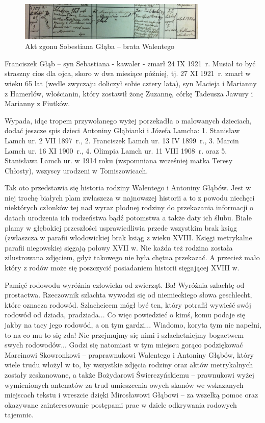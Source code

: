 \begin{figure}[!h]
\begin{center}
\includegraphics[width=0.8\textwidth]{zdjecia/akt_zgonu_sobestiana_glaba.jpg}
\caption[Akt zgonu Sobestiana Głąba]{Akt zgonu Sobestiana Głąba -- brata Walentego}
\label{rys:akt_zgonu_sobestiana_glaba}
\end{center}
\end{figure}

Franciszek Głąb -- syn Sebastiana - kawaler - zmarł 24 IX 1921~r. Musiał to być straszny cios dla ojca, skoro w dwa miesiące później, tj. 27 XI 1921~r. zmarł w wieku 65 lat (wedle zwyczaju doliczył sobie cztery lata), syn Macieja i Marianny z Hamerlów, włościanin, który zostawił żonę Zuzannę, córkę Tadeusza Jawury i Marianny z Fiutków.

Wypada, idąc tropem przywołanego wyżej porzekadła o malowanych dzieciach, dodać jeszcze spis dzieci Antoniny Głąbianki i Józefa Lamcha: 1. Stanisław Lamch ur. 2 VII 1897~r., 2. Franciszek Lamch ur. 13 IV 1899~r., 3. Marcin Lamch ur. 16 XI 1900~r., 4. Olimpia Lamch ur. 11 VIII 1908~r. oraz 5. Stanisława Lamch ur. w 1914 roku (wspomniana wcześniej matka Teresy Chłosty), wszyscy urodzeni w Tomiszowicach.

Tak oto przedstawia się historia rodziny Walentego i Antoniny Głąbów. Jest w niej trochę białych plam zwłaszcza w najnowszej historii a to z powodu niechęci niektórych członków tej nad wyraz płodnej rodziny do przekazania informacji o datach urodzenia ich rodzeństwa bądź potomstwa a także daty ich ślubu. Białe plamy w głębokiej przeszłości usprawiedliwia przede wszystkim brak ksiąg (zwłaszcza w parafii włodowickiej brak ksiąg z wieku XVIII. Księgi metrykalne parafii niegowskiej sięgają połowy XVII w.
Nie każda też rodzina została zilustrowana zdjęciem, gdyż takowego nie była chętna przekazać. A przecież mało który z rodów może się poszczycić posiadaniem historii sięgającej XVIII w. 

Pamięć rodowodu wyróżnia człowieka od zwierząt. Ba! Wyróżnia szlachtę od prostactwa. Rzeczownik szlachta wywodzi się od niemieckiego słowa geschlecht, które oznacza rodowód. Szlachcicem mógł być ten, który potrafił wywieść swój rodowód od dziada, pradziada... Co więc powiedzieć o kimś, komu podaje się jakby na tacy jego rodowód, a on tym gardzi... Wiadomo, koryta tym nie napełni, to na co mu to się zda! Nie przejmujmy się nimi i szlachetniejmy bogactwem swych rodowodów... Godzi się natomiast w tym miejscu gorąco podziękować Marcinowi Skowronkowi -- praprawnukowi Walentego i Antoniny Głąbów, który wiele trudu włożył w to, by wszystkie zdjęcia rodziny oraz aktów metrykalnych zostały zeskanowane, a także Bożydarowi Świerczyńskiemu -- prawnukowi wyżej wymienionych antenatów za trud umieszcenia owych skanów we wskazanych miejscach tekstu i wreszcie dzięki Mirosławowi Głąbowi -- za wszelką pomoc oraz okazywane zainteresowanie postępami prac w dziele odkrywania rodowych tajemnic.

